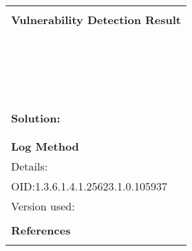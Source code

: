 \documentclass{article}
\begin{document}
\begin{longtable}{|p{}|}
        \hline
        \\
\textbf{Vulnerability Detection Result}\\
\rowcolor{white}{\verb=Best matching OS:=}\\
\rowcolor{white}{\verb=OS:           Debian GNU/Linux=}\\
\rowcolor{white}{\verb=CPE:          cpe:/o:debian:debian_linux=}\\
\rowcolor{white}{\verb=Found by NVT: 1.3.6.1.4.1.25623.1.0.105586 (Operating System (OS) Detection (SSH=}\\
\rowcolor{white}{$\hookrightarrow$\verb=))=}\\
\rowcolor{white}{\verb=Concluded from SSH banner on port 22/tcp: SSH-2.0-OpenSSH_8.4p1 Debian-5=}\\
\rowcolor{white}{\verb=Setting key "Host/runs_unixoide" based on this information=}\\
\rowcolor{white}{\verb=Other OS detections (in order of reliability):=}\\
\rowcolor{white}{\verb=OS:           Debian GNU/Linux=}\\
\rowcolor{white}{\verb=CPE:          cpe:/o:debian:debian_linux=}\\
\rowcolor{white}{\verb=Found by NVT: 1.3.6.1.4.1.25623.1.0.111068 (Operating System (OS) Detection (SMT=}\\
\rowcolor{white}{$\hookrightarrow$\verb=P/POP3/IMAP))=}\\
\rowcolor{white}{\verb=Concluded from SMTP banner on port 25/tcp: 220 localhost.fritz.box ESMTP Postfix=}\\
\rowcolor{white}{$\hookrightarrow$\verb= (Debian/GNU)=}\\
\rowcolor{white}{\verb=OS:           Linux/Unix=}\\
\rowcolor{white}{\verb=CPE:          cpe:/o:linux:kernel=}\\
\rowcolor{white}{\verb=Found by NVT: 1.3.6.1.4.1.25623.1.0.103825 (OpenVAS / Greenbone Vulnerability Ma=}\\
\rowcolor{white}{$\hookrightarrow$\verb=nager Detection (OMP/GMP))=}\\

          \hline
          \\
\textbf{Solution:}\\
\\


        \hline
        \\
\textbf{Log Method}\\
Details:
\rowcolor{white}{\verb=OS Detection Consolidation and Reporting=}\\
OID:1.3.6.1.4.1.25623.1.0.105937\\
Version used:
\rowcolor{white}{\verb=2022-04-05T09:27:51Z=}\\

      \hline
      \\
\textbf{References}\\
\rowcolor{white}{\verb=url: https://community.greenbone.net/c/vulnerability-tests=}\\
\end{longtable}
\end{document}
